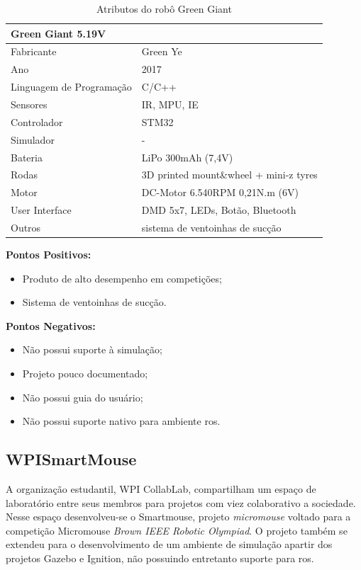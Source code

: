 \begin{table}[H]
	\centering
	\caption{Atributos do robô Green Giant}
	\label{tab:Green_Giant}
	\begin{tabular}{|l|l|}
		\hline
		\multicolumn{2}{|l|}{\textbf{Green Giant 5.19V}} \\ \hline
		Fabricante & Green Ye \\ \hline
		Ano & 2017 \\ \hline
		Linguagem de Programação & C/C++ \\ \hline
		Sensores & IR, MPU, IE \\ \hline
		Controlador & STM32 \\ \hline
		Simulador & - \\ \hline
		Bateria & LiPo 300mAh (7,4V) \\ \hline
		Rodas & 3D printed mount\&wheel + mini-z tyres \\ \hline
		Motor & DC-Motor 6.540RPM 0,21N.m (6V) \\ \hline
		User Interface & DMD 5x7, LEDs, Botão, Bluetooth \\ \hline
		Outros & sistema de ventoinhas de sucção \\ \hline
	\end{tabular}
\end{table}


\textbf{Pontos Positivos:}
\begin{itemize}
	\item Produto de alto desempenho em competições;
	\item Sistema de ventoinhas de sucção.
\end{itemize}


\textbf{Pontos Negativos:}
\begin{itemize}
	\item Não possui suporte à simulação;
	\item Projeto pouco documentado;
	\item Não possui guia do usuário;
	\item Não possui suporte nativo para ambiente \gls*{ros}.
\end{itemize}


\subsection{WPISmartMouse}
A organização estudantil, WPI CollabLab, compartilham um espaço de laboratório entre seus membros para projetos com viez colaborativo a sociedade. Nesse espaço desenvolveu-se o Smartmouse, projeto \textit{micromouse} voltado para a competição Micromouse \textit{Brown IEEE Robotic  Olympiad}. O projeto também se extendeu para o desenvolvimento de um ambiente de simulação apartir dos projetos Gazebo e Ignition, não possuindo entretanto suporte para \gls*{ros}.

